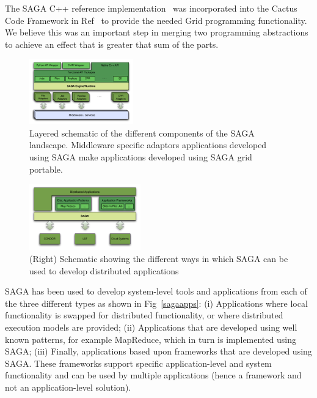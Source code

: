 \documentclass[conference,final]{IEEEtran}
\begin{document}
The SAGA C++ reference implementation~\cite{saga_web} was incorporated
into the Cactus Code Framework in Ref~\cite{escience07} to provide the
needed Grid programming functionality.  We believe this was an
important step in merging two programming abstractions to achieve an
effect that is greater that sum of the parts. 


\begin{figure}[!ht]
  \begin{center}
      \includegraphics[width=0.40\textwidth]{stci_saga_figures-1.pdf}
  \end{center}
  \caption{\small Layered schematic of the different components
    of the SAGA landscape.  Middleware specific adaptors applications
    developed using SAGA make applications developed using SAGA grid
    portable.}
 \label{sagalayer}
\end{figure}

\begin{figure}[!ht]
  \begin{center}
\includegraphics[width=0.43\textwidth]{saga_platform_figures.pdf}
\end{center}
  \caption{\small(Right) Schematic showing the different ways in which
    SAGA can be used to develop distributed applications}
 \label{sagapps}
\end{figure}

SAGA has been used to develop system-level tools and applications from
each of the three different types as shown in Fig~\ref{sagaapps}: (i)
Applications where local functionality is swapped for distributed
functionality, or where distributed execution models are provided;
(ii) Applications that are developed using well known patterns, for
example MapReduce, which in turn is implemented using SAGA; (iii)
Finally, applications based upon frameworks that are developed using
SAGA. These frameworks support specific application-level and system
functionality and can be used by multiple applications (hence a
framework and not an application-level solution).
\end{document}
